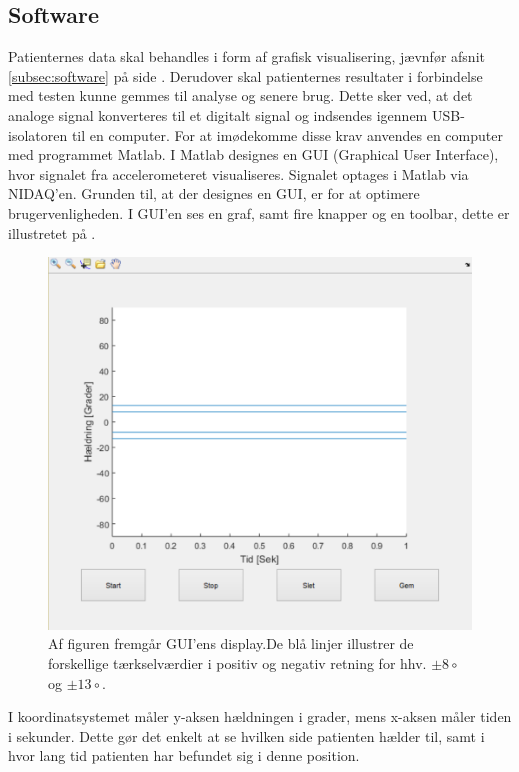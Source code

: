 \subsection{Software}
Patienternes data skal behandles i form af grafisk visualisering, jævnfør afsnit \ref{subsec:software} på side \pageref{subsec:software}. Derudover skal patienternes resultater i forbindelse med testen kunne gemmes til analyse og senere brug. Dette sker ved, at det analoge signal konverteres til et digitalt signal og indsendes igennem USB-isolatoren til en computer. For at imødekomme disse krav anvendes en computer med programmet Matlab. I Matlab designes en GUI (Graphical User Interface), hvor signalet fra accelerometeret visualiseres. Signalet optages i Matlab via NIDAQ'en. Grunden til, at der designes en GUI, er for at optimere brugervenligheden. I GUI'en ses en graf, samt fire knapper og en toolbar, dette er illustretet på . 
\begin{figure}[H] 
	\centering 
	\includegraphics[scale=0.5]{figures/cProblemloesning/GUI_generisk.PNG}
	\caption{Af figuren fremgår GUI'ens display.De blå linjer illustrer de forskellige tærkselværdier i positiv og negativ retning for hhv. $\pm 8\circ$ og $\pm 13\circ$.}
	\label{Fig:GUI_generisk}
\end{figure} 
I koordinatsystemet måler y-aksen hældningen i grader, mens x-aksen måler tiden i sekunder. Dette gør det enkelt at se hvilken side patienten hælder til, samt i hvor lang tid patienten har befundet sig i denne position.
